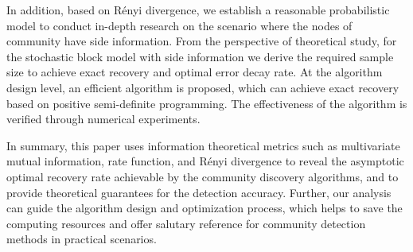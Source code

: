 \begin{abstract*}
  In addition, based on Rényi divergence,
  we establish a reasonable probabilistic model
  to conduct in-depth research on the scenario
  where the nodes of community have side information.
  From the perspective of theoretical study,
  for the stochastic block model with side information
  we derive the required sample size to achieve exact recovery and optimal error decay rate.
  At the algorithm design level,
  an efficient algorithm is proposed, which can achieve exact recovery based on positive semi-definite programming.
  The effectiveness of the algorithm is verified through numerical experiments.

  In summary, this paper uses information theoretical metrics
  such as multivariate mutual information,
  rate function, and Rényi divergence to reveal the asymptotic
  optimal recovery rate achievable by the community discovery algorithms,
  and to provide theoretical guarantees for the detection accuracy.
  Further, our analysis can guide the algorithm design and optimization process,
  which helps to save the computing resources and offer salutary reference
  for community detection methods in practical scenarios.
\end{abstract*}
